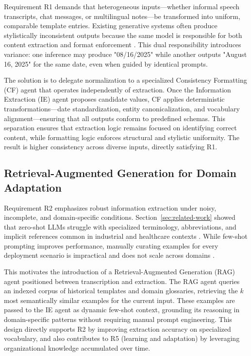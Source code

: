 Requirement R1 demands that heterogeneous inputs—whether informal speech transcripts, chat messages, or multilingual notes—be transformed into uniform, comparable template entries. Existing generative systems often produce stylistically inconsistent outputs because the same model is responsible for both content extraction and format enforcement \cite{huang2024authorship}. This dual responsibility introduces variance: one inference may produce "08/16/2025" while another outputs "August 16, 2025" for the same date, even when guided by identical prompts.

The solution is to delegate normalization to a specialized Consistency Formatting (CF) agent that operates independently of extraction. Once the Information Extraction (IE) agent proposes candidate values, CF applies deterministic transformations—date standardization, entity canonicalization, and vocabulary alignment—ensuring that all outputs conform to predefined schemas. This separation ensures that extraction logic remains focused on identifying correct content, while formatting logic enforces structural and stylistic uniformity. The result is higher consistency across diverse inputs, directly satisfying R1.

\subsection{Retrieval-Augmented Generation for Domain Adaptation}
\label{subsec:rag-domain-adaptation}

Requirement R2 emphasizes robust information extraction under noisy, incomplete, and domain-specific conditions. Section~\ref{sec:related-work} showed that zero-shot LLMs struggle with specialized terminology, abbreviations, and implicit references common in industrial and healthcare contexts \cite{wang2021spoken}. While few-shot prompting improves performance, manually curating examples for every deployment scenario is impractical and does not scale across domains \cite{wei2022emergent}.

This motivates the introduction of a Retrieval-Augmented Generation (RAG) agent positioned between transcription and extraction. The RAG agent queries an indexed corpus of historical templates and domain glossaries, retrieving the $k$ most semantically similar examples for the current input. These examples are passed to the IE agent as dynamic few-shot context, grounding its reasoning in domain-specific patterns without requiring manual prompt engineering. This design directly supports R2 by improving extraction accuracy on specialized vocabulary, and also contributes to R5 (learning and adaptation) by leveraging organizational knowledge accumulated over time.

